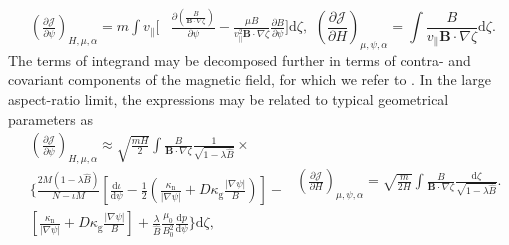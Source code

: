 \begin{subequations}
\label{eq:whole}
\begin{equation}
\begin{split}
\left( \frac{\partial \mathcal{J}}{\partial \psi} \right)_{H,\mu,\alpha} = m \int v_\parallel \Bigg[ & \frac{\partial \left( \frac{B}{\mathbf{B} \cdot \nabla \zeta} \right)}{\partial \psi} -  \frac{\mu B }{v_\parallel^2 \mathbf{B} \cdot \nabla  \zeta } \frac{\partial B}{\partial \psi} \Bigg] \mathrm{d}\zeta, \label{local3D_dJ_approx:1}
\end{split}
\end{equation}
\begin{equation}
\left( \frac{\partial \mathcal{J}}{\partial H} \right)_{\mu,\psi,\alpha} = \int \frac{B}{v_\parallel \mathbf{B} \cdot \nabla \zeta} \mathrm{d} \zeta \label{local3D_dJ_approx:2}.
\end{equation}
\label{eq:dJ_approx_hegna}
\end{subequations}
The terms of integrand may be decomposed further in terms of contra- and covariant components of the magnetic field,  for which we refer to \citet{hegna2015effect}. In the large aspect-ratio limit, the expressions may be related to typical geometrical parameters as
\begin{subequations}
\label{eq:whole}
\begin{equation}
\begin{split}
& \left( \frac{\partial \mathcal{J}}{\partial \psi} \right)_{H,\mu,\alpha} \approx \sqrt{\frac{m H}{2}} \int \frac{B}{ \mathbf{B} \cdot \nabla \zeta } \frac{1}{ \sqrt{1 - \lambda \hat{B}} } \times \\
& \Bigg\{ \frac{2M( 1 - \lambda \hat{B} )}{N - \iota M} \left[ \frac{\mathrm{d}\iota}{\mathrm{d}\psi} - \frac{1}{2} \left( \frac{\kappa_{\mathrm{n}}}{|\nabla \psi|} + D\kappa_{\mathrm{g}} \frac{|\nabla \psi|}{B} \right) \right] 
- \\ 
& \left[ \frac{\kappa_{\mathrm{n}}}{|\nabla \psi|} + D\kappa_{\mathrm{g}} \frac{|\nabla \psi|}{B} \right] +  \frac{\lambda}{\hat{B}} \frac{\mu_0}{B_0^2} \frac{ \mathrm{d} p}{ \mathrm{d} \psi}\Bigg\} \mathrm{d}\zeta, \label{local3D_dJ:1}
\end{split}
\end{equation}
\begin{eqnarray}
\left( \frac{\partial \mathcal{J}}{\partial H} \right)_{\mu,\psi,\alpha} = \sqrt{\frac{m}{2H}} \int \frac{B}{ \mathbf{B} \cdot \nabla \zeta } \frac{\mathrm{d}\zeta}{\sqrt{1 - \lambda \hat{B}}}  \label{local3D_dJ:2}.
\end{eqnarray}
\end{subequations}
